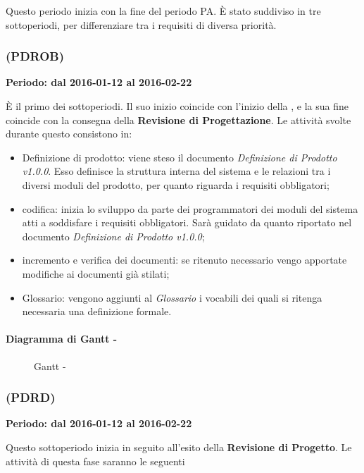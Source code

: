 \documentclass[./PianoDiProgetto.tex]{subfiles}
\begin{document}
  Questo periodo inizia con la fine del periodo PA. È stato suddiviso in tre sottoperiodi, per differenziare tra i requisiti di diversa priorità.

  \subsubsection{\PerPDROB{} (PDROB)}
  \textbf{Periodo: dal 2016-01-12 al 2016-02-22}

  È il primo dei sottoperiodi. Il suo inizio coincide con l'inizio della \PerPDR[], e la sua fine coincide con la consegna della \textbf{Revisione di Progettazione}. Le attività svolte durante questo consistono in:
  \begin{itemize}
    \item Definizione di prodotto: viene steso il documento \textit{Definizione di Prodotto v1.0.0}. Esso definisce la struttura interna del sistema e le relazioni tra i diversi moduli del prodotto, per quanto riguarda i requisiti obbligatori;
    \item codifica: inizia lo sviluppo da parte dei programmatori dei moduli del sistema atti a soddisfare i requisiti obbligatori. Sarà guidato da quanto riportato nel documento \textit{Definizione di Prodotto v1.0.0};
    \item incremento e verifica dei documenti: se ritenuto necessario vengo apportate modifiche ai documenti già stilati;
    \item Glossario: vengono aggiunti al \textit{Glossario} i vocabili dei quali si ritenga necessaria una definizione formale.
  \end{itemize}

  \paragraph{Diagramma di Gantt - \PerPDROB}
    \begin{figure}[!h]
    \centering
    \caption{Gantt - \PerPDROB}
    \end{figure}

  \subsubsection{\PerPDRD{} (PDRD)}
  \textbf{Periodo: dal 2016-01-12 al 2016-02-22}

  Questo sottoperiodo inizia in seguito all'esito della \textbf{Revisione di Progetto}. Le attività di questa fase saranno le seguenti
\end{document}
